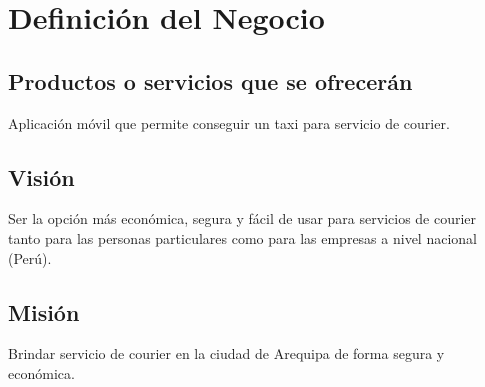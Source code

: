 \chapter{Definición del Negocio}

\section{Productos o servicios que se ofrecerán}

Aplicación móvil que permite conseguir un taxi para servicio de courier.


\section{Visión}

Ser la opción más económica, segura y fácil de usar para servicios de courier tanto para las personas particulares como para las empresas a nivel nacional (Perú).

\section{Misión}

Brindar servicio de courier en la ciudad de Arequipa de forma segura y económica.